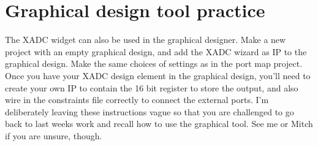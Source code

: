 \documentclass[../physical_computing.tex]{subfiles}
\begin{document}
\section{Graphical design tool practice}
\label{sec:gui}

The XADC widget can also be used in the graphical designer. Make a new project with an empty graphical design, and add the XADC wizard as IP to the graphical design. Make the same choices of settings as in the port map project. Once you have your XADC design element in the graphical design, you'll need to create your own IP to contain the 16 bit register to store the output, and also wire in the constraints file correctly to connect the external ports. I'm deliberately leaving these instructions vague so that you are challenged to go back to last weeks work and recall how to use the graphical tool. See me or Mitch if you are unsure, though.
\end{document}
